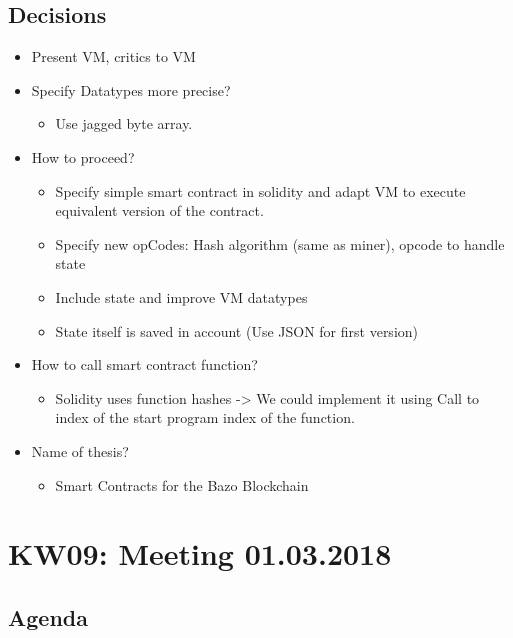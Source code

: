\subsection{Decisions}
\begin{itemize}
\item
  Present VM, critics to VM
\item
  Specify Datatypes more precise?

  \begin{itemize}
  \item
    Use jagged byte array.
  \end{itemize}
\item
  How to proceed?

  \begin{itemize}
  \item
    Specify simple smart contract in solidity and adapt VM to execute
    equivalent version of the contract.
  \item
    Specify new opCodes: Hash algorithm (same as miner), opcode to
    handle state
  \item
    Include state and improve VM datatypes
  \item
    State itself is saved in account (Use JSON for first version)
  \end{itemize}
\item
  How to call smart contract function?

  \begin{itemize}
  \item
    Solidity uses function hashes -\textgreater{} We could implement it
    using Call to index of the start program index of the function.
  \end{itemize}
\item
  Name of thesis?

  \begin{itemize}
  \item
    Smart Contracts for the Bazo Blockchain
  \end{itemize}
\end{itemize}

\section{KW09: Meeting 01.03.2018}

\subsection{Agenda}

